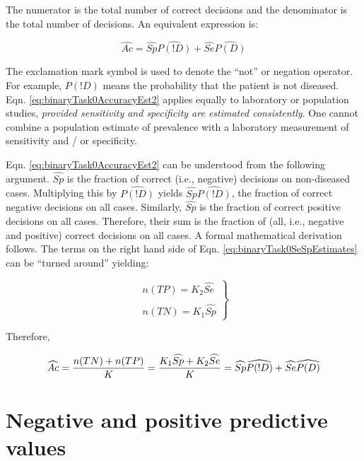\documentclass[
]{book}
\begin{document}
The numerator is the total number of correct decisions and the denominator is the total number of decisions. An equivalent expression is:

\begin{equation} 
\widehat{Ac}=\widehat{Sp}\widehat{P(!D)}+\widehat{Se}\widehat{P(D)}
\label{eq:binaryTask0AccuracyEst2}
\end{equation}

The exclamation mark symbol is used to denote the ``not'' or negation operator. For example, \(P(!D)\) means the probability that the patient is not diseased. Eqn. \eqref{eq:binaryTask0AccuracyEst2} applies equally to laboratory or population studies, \emph{provided sensitivity and specificity are estimated consistently}. One cannot combine a population estimate of prevalence with a laboratory measurement of sensitivity and / or specificity.

Eqn. \eqref{eq:binaryTask0AccuracyEst2} can be understood from the following argument. \(\widehat{Sp}\) is the fraction of correct (i.e., negative) decisions on non-diseased cases. Multiplying this by \(\widehat{P(!D)}\) yields \(\widehat{Sp} \widehat{P(!D)}\), the fraction of correct negative decisions on all cases. Similarly, \(\widehat{Sp}\) is the fraction of correct positive decisions on all cases. Therefore, their sum is the fraction of (all, i.e., negative and positive) correct decisions on all cases. A formal mathematical derivation follows. The terms on the right hand side of Eqn. \eqref{eq:binaryTask0SeSpEstimates} can be ``turned around'' yielding:

\begin{equation} 
\left.\begin{matrix}
n(TP)=K_2 \widehat{Se}\\ 
\\
n(TN)=K_1 \widehat{Sp}
\end{matrix}\right\}
\label{eq:binaryTask0nTpnTN}
\end{equation}

Therefore,

\begin{equation} 
\widehat{Ac}=\frac{n(TN)+n(TP)}{K}\\
=\frac{K_1 \widehat{Sp}+K_2 \widehat{Se}}{K}\\
=\widehat{Sp} \widehat{P(!D)}+\widehat{Se}\widehat{P(D)}
\label{eq:binaryTask0AccuracyDeriv}
\end{equation}

\hypertarget{negative-and-positive-predictive-values}{%
\section{Negative and positive predictive values}\label{negative-and-positive-predictive-values}}
\end{document}
